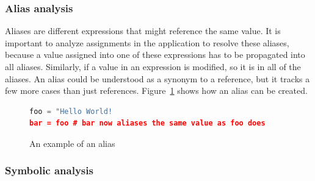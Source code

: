 \subsubsection{Alias analysis}

Aliases are different expressions that might reference the same value. It is important to analyze assignments in the application to resolve these aliases, because a value assigned into one of these expressions has to be propagated into all aliases. Similarly, if a value in an expression is modified, so it is in all of the aliases. An alias could be understood as a synonym to a reference, but it tracks a few more cases than just references. Figure~\ref{fig:alias} shows how an alias can be created.

\begin{figure}[ht]
\begin{lstlisting}[language=Python] 
foo = "Hello World!
bar = foo # bar now aliases the same value as foo does
\end{lstlisting}
\caption{An example of an alias}
\label{fig:alias}
\end{figure}

\subsubsection{Symbolic analysis}

